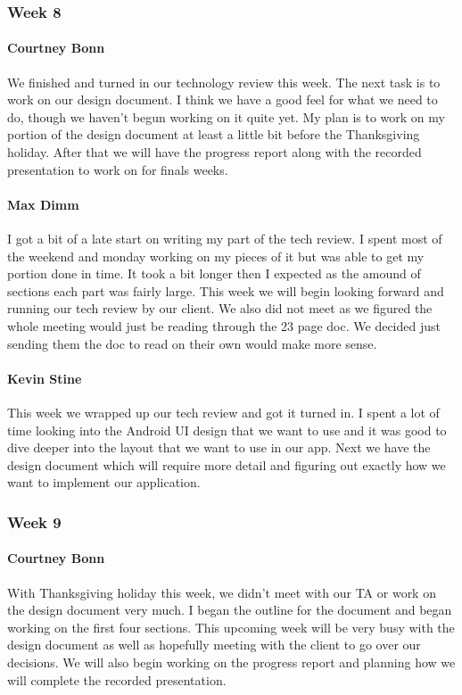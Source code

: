\documentclass[letterpaper,10pt,draftclsnofoot,onecolumn,titlepage]{IEEEtran}
\begin{document}
		\subsubsection{Week 8}
		
			\paragraph{Courtney Bonn}
			We finished and turned in our technology review this week. The next task is to work on our design document. I think we have a good feel for what we need to do, though we haven't begun working on it quite yet. My plan is to work on my portion of the design document at least a little bit before the Thanksgiving holiday. After that we will have the progress report along with the recorded presentation to work on for finals weeks.

			\paragraph{Max Dimm}
			I got a bit of a late start on writing my part of the tech review. I spent most of the weekend and monday working on my pieces of it but was able to get my portion done in time. It took a bit longer then I expected as the amound of sections each part was fairly large. This week we will begin looking forward and running our tech review by our client. We also did not meet as we figured the whole meeting would just be reading through the 23 page doc. We decided just sending them the doc to read on their own would make more sense.
			
			\paragraph{Kevin Stine}
			This week we wrapped up our tech review and got it turned in. I spent a lot of time looking into the Android UI design that we want to use and it was good to dive deeper into the layout that we want to use in our app. Next we have the design document which will require more detail and figuring out exactly how we want to implement our application.
		
		\subsubsection{Week 9}
		
			\paragraph{Courtney Bonn}
			With Thanksgiving holiday this week, we didn't meet with our TA or work on the design document very much. I began the outline for the document and began working on the first four sections. This upcoming week will be very busy with the design document as well as hopefully meeting with the client to go over our decisions. We will also begin working on the progress report and planning how we will complete the recorded presentation.
\end{document}
